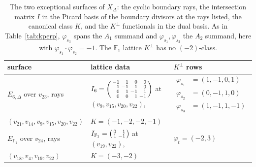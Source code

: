 \documentclass[11pt]{amsart}
\theoremstyle{definition}
\theoremstyle{remark}
\theoremstyle{plain}
\newcommand{\Xh}{\widehat{X}}
\begin{document}
\begin{table}\centering
\caption{The two exceptional surfaces of $\Xh_{\Delta}$: the cyclic
boundary rays, the intersection matrix $I$ in the Picard basis of the
boundary divisors at the rays listed, the canonical class $K$, and the
$K^{\perp}$ functionals in the dual basis.  As in Table~\ref{tab:kperp},
$\varphi_{s_3}$ spans the $A_1$ summand and
$\varphi_{s_1},\varphi_{s_2}$ the $A_2$ summand, here with
$\varphi_{s_1}\cdot\varphi_{s_2}=-1$.  The $\mathbb F_1$ lattice
$K^{\perp}$ has no $(-2)$-class.}\label{tab:partnersurf}
\begin{tabular}{lll}
\toprule
surface & lattice data & $K^{\perp}$ rows\\
\midrule
$E_{6,\Delta}$ over $v_{23}$, rays &
$I_6=\begin{psmallmatrix*}[r]-1&1&0&0\\1&-1&1&0\\0&1&-1&1\\
0&0&1&-1\end{psmallmatrix*}$ at $(v_9,v_{15},v_{20},v_{22})$, &
$\begin{aligned}\varphi_{s_1}&=(1,-1,0,1)\\
\varphi_{s_2}&=(0,-1,1,0)\\
\varphi_{s_3}&=(1,-1,1,-1)\end{aligned}$\\
$(v_{21},v_{14},v_9,v_{15},v_{20},v_{22})$ &
$K=(-1,-2,-2,-1)$ &\\[1.2em]
$E_{\mathbb F_1}$ over $v_{24}$, rays &
$I_{\mathbb F_1}=\begin{psmallmatrix*}[r]0&1\\1&-1
\end{psmallmatrix*}$ at $(v_{19},v_{22})$, &
$\varphi_{t}=(-2,3)$\\
$(v_{18},v_4,v_{19},v_{22})$ & $K=(-3,-2)$ &\\
\bottomrule
\end{tabular}
\end{table}
\end{document}
